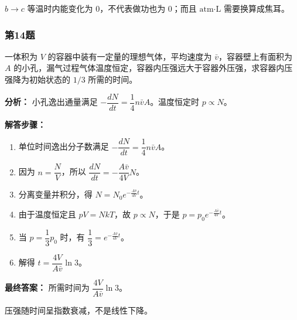 \documentclass[12pt,a4paper]{ctexart}
\begin{document}
\begin{tcolorbox}[colback=red!2!white,colframe=red!55!black,title={易错点}]
\(b\to c\) 等温时内能变化为 0，不代表做功也为 0；而且 \(\text{atm·L}\) 需要换算成焦耳。\par
\end{tcolorbox}


\subsubsection*{第14题}
\begin{tcolorbox}[colback=gray!2!white,colframe=black!60,title={题目}]
一体积为 \(V\) 的容器中装有一定量的理想气体，平均速度为 \(\bar v\)，容器壁上有面积为 \(A\) 的小孔，漏气过程气体温度恒定，容器内压强远大于容器外压强，求容器内压强降为初始状态的 \(1/3\) 所需的时间。\par
\end{tcolorbox}
\begin{tcolorbox}[colback=blue!2!white,colframe=blue!55!black,title={完整答案}]
\textbf{分析：}
小孔逸出通量满足 \(-\dfrac{dN}{dt}=\dfrac14 n\bar vA\)。温度恒定时 \(p\propto N\)。\par
\textbf{解答步骤：}
\begin{enumerate}
\item 单位时间逸出分子数满足 \(-\dfrac{dN}{dt}=\dfrac14 n\bar vA\)。
\item 因为 \(n=\dfrac{N}{V}\)，所以 \(\dfrac{dN}{dt}=-\dfrac{A\bar v}{4V}N\)。
\item 分离变量并积分，得 \(N=N_0e^{-\frac{A\bar v}{4V}t}\)。
\item 由于温度恒定且 \(pV=NkT\)，故 \(p\propto N\)，于是 \(p=p_0e^{-\frac{A\bar v}{4V}t}\)。
\item 当 \(p=\dfrac13 p_0\) 时，有 \(\dfrac13=e^{-\frac{A\bar v}{4V}t}\)。
\item 解得 \(t=\dfrac{4V}{A\bar v}\ln 3\)。
\end{enumerate}
\textbf{最终答案：}
所需时间为 \(\dfrac{4V}{A\bar v}\ln 3\)。\par
\end{tcolorbox}
\begin{tcolorbox}[colback=red!2!white,colframe=red!55!black,title={易错点}]
压强随时间呈指数衰减，不是线性下降。\par
\end{tcolorbox}
\end{document}
